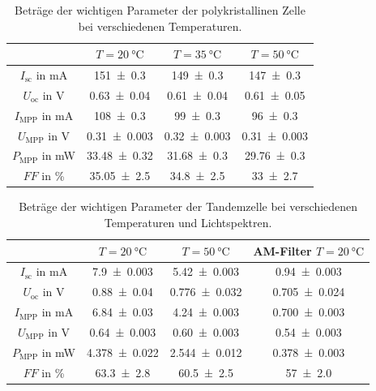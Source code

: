 \documentclass[
	a4paper,
	12pt,
	pagesize,
	ngerman
]{scrartcl}
\begin{document}
\begin{table}[H]
		\centering
		\begin{tabular}{c | c | c | c  }
			 &$T=\SI{20}{\celsius}$& $T=\SI{35}{\celsius}$& $T=\SI{50}{\celsius}$ \\ \hline
			 $I_\text{sc}$ in \si{mA}& \SI{151+-0.3}{}&\SI{149+-0.3}{}& \SI{147+-0.3}{} \\
			 $U_\text{oc}$ in \si{V}&\SI{0.63+-0.04}{}&\SI{0.61+-0.04}{}&\SI{0.61+-0.05}{} \\
			 $I_\text{MPP}$ in \si{mA}&\SI{108+-0.3}{}&\SI{99+-0.3}{}&\SI{96+-0.3}{} \\
			 $U_\text{MPP}$ in \si{V}&\SI{0.31+-0.003}{}&\SI{0.32+-0.003}{}&\SI{0.31+-0.003}{} \\
			 $P_\text{MPP}$ in \si{mW}&\SI{33.48+-0.32}{}&\SI{31.68+-0.3}{}&\SI{29.76+-0.3}{} \\
			 $FF$ in \si{\percent}&\SI{35.05+-2.5}{}&\SI{34.8+-2.5}{}&\SI{33+-2.7}{} \\
		\end{tabular}
		\caption{
		Beträge der wichtigen Parameter der polykristallinen Zelle bei verschiedenen Temperaturen.
		}
		\label{tb_solar_param_poly}
\end{table}

\begin{table}[H]
		\centering
		\begin{tabular}{c | c | c | c  }
			 &$T=\SI{20}{\celsius}$& $T=\SI{50}{\celsius}$& AM-Filter $T=\SI{20}{\celsius}$ \\ \hline
			 $I_\text{sc}$ in \si{mA}& \SI{7.9+-0.003}{}&\SI{5.42+-0.003}{}& \SI{0.94+-0.003}{} \\
			 $U_\text{oc}$ in \si{V}&\SI{0.88+-0.04}{}&\SI{0.776+-0.032}{}&\SI{0.705+-0.024}{} \\
			 $I_\text{MPP}$ in \si{mA}&\SI{6.84+-0.03}{}&\SI{4.24+-0.003}{}&\SI{0.700+-0.003}{} \\
			 $U_\text{MPP}$ in \si{V}&\SI{0.64+-0.003}{}&\SI{0.60+-0.003}{}&\SI{0.54+-0.003}{} \\
			 $P_\text{MPP}$ in \si{mW}&\SI{4.378+-0.022}{}&\SI{2.544+-0.012}{}&\SI{0.378+-0.003}{} \\
			 $FF$ in \si{\percent}&\SI{63.3+-2.8}{}&\SI{60.5+-2.5}{}&\SI{57+-2.0}{} \\
		\end{tabular}
		\caption{
		Beträge der wichtigen Parameter der Tandemzelle bei verschiedenen Temperaturen und Lichtspektren.
		}
		\label{tb_solar_param_tandem}
\end{table}
\end{document}
